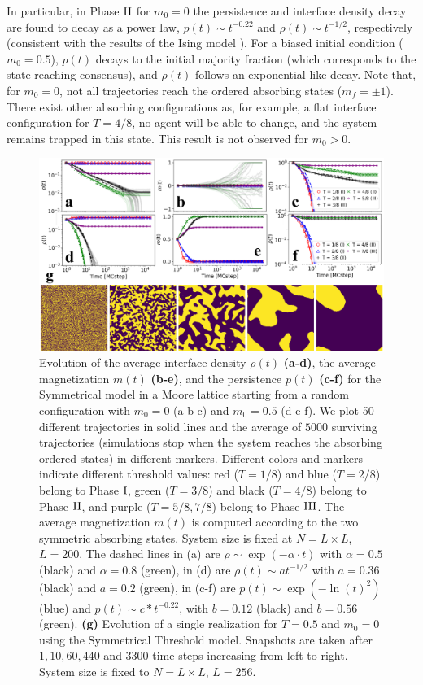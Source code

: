 In particular, in Phase ${\rm II}$ for $m_0 = 0$ the persistence and interface density decay are found to decay as a power law, $p(t) \sim t^{-0.22}$ and $\rho(t) \sim t^{-1/2}$, respectively (consistent with the results of the Ising model \cite{stauffer-1994,derrida-1995A,derrida-1995B,derrida-1997}). For a biased initial condition ($m_0 = 0.5$), $p(t)$ decays to the initial majority fraction (which corresponds to the state reaching consensus), and $\rho(t)$ follows an exponential-like decay. Note that, for $m_0 = 0$, not all trajectories reach the ordered absorbing states ($m_f=\pm 1$). There exist other absorbing configurations as, for example,  a flat interface configuration for $T = 4/8$, no agent will be able to change, and the system remains trapped in this state. This result is not observed for $m_0 > 0$.
\begin{figure}[ht]
		\centering \captionsetup{font=sf}
		\includegraphics[width=\linewidth]{Figs/Aging_STM/FIG10_THESIS.pdf}
		\caption[Dynamical regimes in a Moore lattice.]{\label{fig:evolution_lattice} Evolution of the average interface density $\rho(t)$ \textbf{(a-d)}, the average magnetization $m(t)$ \textbf{(b-e)}, and the persistence $p(t)$ \textbf{(c-f)} for the Symmetrical model in a Moore lattice starting from a random configuration with $m_0 = 0$ (a-b-c) and $m_0 = 0.5$ (d-e-f). We plot 50 different trajectories in solid lines and the average of $5000$ surviving trajectories (simulations stop when the system reaches the absorbing ordered states) in different markers. Different colors and markers indicate different threshold values: red ($T = 1/8$) and blue ($T = 2/8$) belong to Phase ${\rm I}$, green ($T = 3/8$) and black ($T=4/8$) belong to Phase ${\rm II}$, and purple ($T = 5/8, 7/8$) belong to Phase ${\rm III}$. The average magnetization $m(t)$ is computed according to the two symmetric absorbing states. System size is fixed at $N = L \times L$, $L = 200$. The dashed lines in (a) are $\rho \sim \exp(-\alpha \cdot t)$ with $\alpha = 0.5$ (black) and $\alpha = 0.8$ (green), in (d) are $\rho(t) \sim at^{-1/2}$ with $a = 0.36$ (black) and $a = 0.2$ (green), in (c-f) are $p(t) \sim \exp(- \ln(t)^2)$ (blue) and $p(t) \sim c*t^{-0.22}$, with $b = 0.12$ (black) and $b = 0.56$ (green). \textbf{(g)} Evolution of a single realization for $T = 0.5$ and $m_0 = 0$ using the Symmetrical Threshold model. Snapshots are taken after $1,10,60,440$ and $3300$ time steps increasing from left to right. System size is fixed to $N = L \times L$, $L = 256$.
}
\end{figure}
